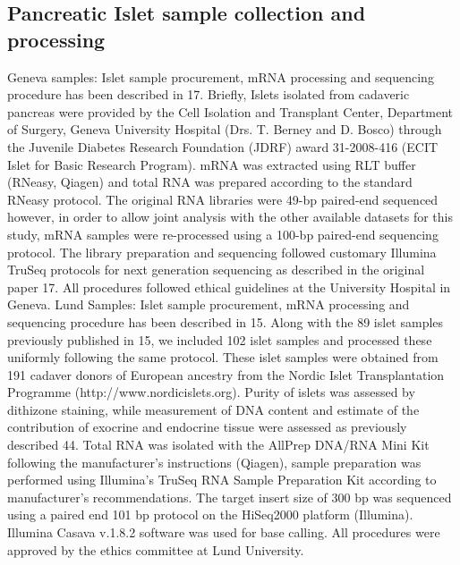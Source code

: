 \subsection{Pancreatic Islet sample collection and processing}
Geneva samples: Islet sample procurement, mRNA processing and sequencing procedure has been described in 17. Briefly, Islets isolated from cadaveric pancreas were provided by the Cell Isolation and Transplant Center, Department of Surgery, Geneva University Hospital (Drs. T. Berney and D. Bosco) through the Juvenile Diabetes Research Foundation (JDRF) award 31-2008-416 (ECIT Islet for Basic Research Program). mRNA was extracted using RLT buffer (RNeasy, Qiagen) and total RNA was prepared according to the standard RNeasy protocol. The original RNA libraries were 49-bp paired-end sequenced however, in order to allow joint analysis with the other available datasets for this study, mRNA samples were re-processed using a 100-bp paired-end sequencing protocol. The library preparation and sequencing followed customary Illumina TruSeq protocols for next generation sequencing as described in the original paper 17. All procedures followed ethical guidelines at the University Hospital in Geneva.
Lund Samples: Islet sample procurement, mRNA processing and sequencing procedure has been described in 15. Along with the 89 islet samples previously published in 15, we included 102 islet samples and processed these uniformly following the same protocol. These islet samples were obtained from 191 cadaver donors of European ancestry from the Nordic Islet Transplantation Programme (http://www.nordicislets.org). Purity of islets was assessed by dithizone staining, while measurement of DNA content and estimate of the contribution of exocrine and endocrine tissue were assessed as previously described 44. Total RNA was isolated with the AllPrep DNA/RNA Mini Kit following the manufacturer’s instructions (Qiagen), sample preparation was performed using Illumina’s TruSeq RNA Sample Preparation Kit according to manufacturer's recommendations. The target insert size of 300 bp was sequenced using a paired end 101 bp protocol on the HiSeq2000 platform (Illumina). Illumina Casava v.1.8.2 software was used for base calling. All procedures were approved by the ethics committee at Lund University.

